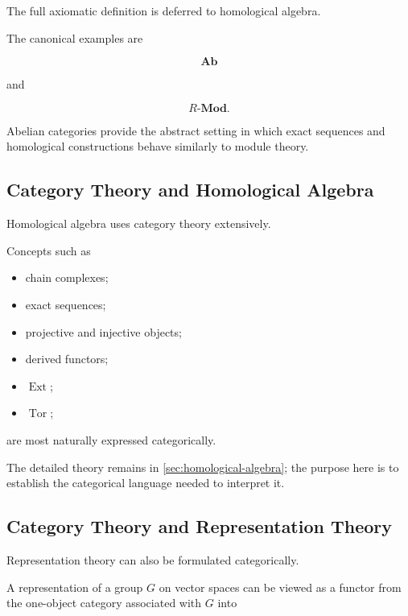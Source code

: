 The full axiomatic definition is deferred to homological algebra.

The canonical examples are

\[ \mathbf{Ab} \]

and

\[ R\text{-}\mathbf{Mod}. \]

Abelian categories provide the abstract setting in which exact sequences
and homological constructions behave similarly to module theory.

\subsection{Category Theory and Homological Algebra}
\label{subsec:category-homological-algebra}

Homological algebra uses category theory extensively.

Concepts such as

\begin{itemize}
    \item chain complexes;
    \item exact sequences;
    \item projective and injective objects;
    \item derived functors;
    \item \(\operatorname{Ext}\);
    \item \(\operatorname{Tor}\);
\end{itemize}

are most naturally expressed categorically.

The detailed theory remains in \cref{sec:homological-algebra}; the purpose
here is to establish the categorical language needed to interpret it.

\subsection{Category Theory and Representation Theory}
\label{subsec:category-representation-theory}

Representation theory can also be formulated categorically.

A representation of a group \(G\) on vector spaces can be viewed as a
functor from the one-object category associated with \(G\) into

